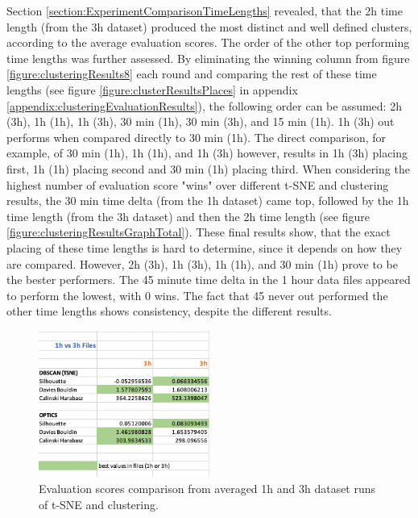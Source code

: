 Section \ref{section:ExperimentComparisonTimeLengths} revealed, that the 2h time length (from the 3h dataset) produced the most distinct and well defined clusters, according to the average evaluation scores. The order of the other top performing time lengths was further assessed. By eliminating the winning column from figure \ref{figure:clusteringResults8} each round and comparing the rest of these time lengths (see figure \ref{figure:clusterResultsPlaces} in appendix \ref{appendix:clusteringEvaluationResults}), the following order can be assumed: 2h (3h), 1h (1h), 1h (3h), 30 min (1h), 30 min (3h), and 15 min (1h). 1h (3h) out performs when compared directly to 30 min (1h). The direct comparison, for example, of 30 min (1h), 1h (1h), and 1h (3h) however, results in 1h (3h) placing first, 1h (1h) placing second and 30 min (1h) placing third. When considering the highest number of evaluation score "wins" over different t-SNE and clustering results, the 30 min time delta (from the 1h dataset) came top, followed by the 1h time length (from the 3h dataset) and then the 2h time length (see figure \ref{figure:clusteringResultsGraphTotal}). These final results show, that the exact placing of these time lengths is hard to determine, since it depends on how they are compared. However, 2h (3h), 1h (3h), 1h (1h), and 30 min (1h) prove to be the bester performers.
The 45 minute time delta in the 1 hour data files appeared to perform the lowest, with 0 wins. The fact that 45 never out performed the other time lengths shows consistency, despite the different results.
 


\begin{figure}
  \centering
  \includegraphics[width=0.5\textwidth]{./images/clusteringResults/clusteringResults7.png}
  \caption{Evaluation scores comparison from averaged 1h and 3h dataset runs of t-SNE and clustering.}
  \label{figure:clusteringResults7}
\end{figure}


